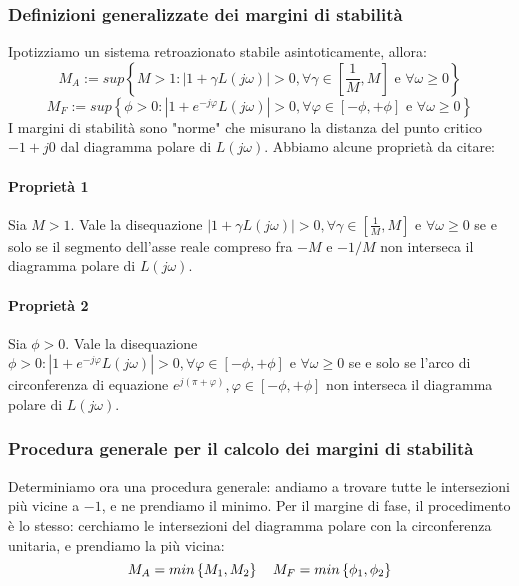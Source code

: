 \documentclass[11pt]{article}
\begin{document}
\subsubsection{Definizioni generalizzate dei margini di stabilità}
Ipotizziamo un sistema retroazionato stabile asintoticamente, allora:
\begin{displaymath}
    M_A := sup \left\{M>1: |1+\gamma L(j\omega)|>0, \forall \gamma \in \left[\frac{1}{M},M\right] \textrm{ e }\forall\omega\ge0\right\}
\end{displaymath}
\begin{displaymath}
    M_F := sup\left\{\phi>0: |1+e^{-j\varphi}L(j\omega)|>0, \forall \varphi \in \left[-\phi,+\phi\right] \textrm{ e }\forall\omega\ge0\right\}
\end{displaymath}
I margini di stabilità sono "norme" che misurano la distanza del punto critico $-1+j0$ dal diagramma polare di $L(j\omega)$.
Abbiamo alcune proprietà da citare:
\paragraph{Proprietà 1} Sia $M>1$. Vale la disequazione $|1+\gamma L(j\omega)|>0, \forall \gamma \in \left[\frac{1}{M},M\right] \textrm{ e }\forall\omega\ge0$ se e solo se il segmento dell'asse reale compreso fra $-M$ e $-1/M$ non interseca il diagramma polare di $L(j\omega)$. 
\paragraph{Proprietà 2} Sia $\phi>0$. Vale la disequazione $\phi>0: |1+e^{-j\varphi}L(j\omega)|>0, \forall \varphi \in \left[-\phi,+\phi\right] \textrm{ e }\forall\omega\ge0$ se e solo se l'arco di circonferenza di equazione $e^{j(\pi+\varphi)}, \varphi \in \left[-\phi, +\phi\right]$ non interseca il diagramma polare di $L(j\omega)$.
\subsubsection{Procedura generale per il calcolo dei margini di stabilità}
Determiniamo ora una procedura generale: andiamo a trovare tutte le intersezioni più vicine a $-1$, e ne prendiamo il minimo. Per il margine di fase, il procedimento è lo stesso: cerchiamo le intersezioni del diagramma polare con la circonferenza unitaria, e prendiamo la più vicina:
\begin{displaymath}
    M_A = min\left\{M_1,M_2\right\}\hspace{10px}M_F = min\left\{\phi_1,\phi_2\right\}
\end{displaymath} 
\end{document}
